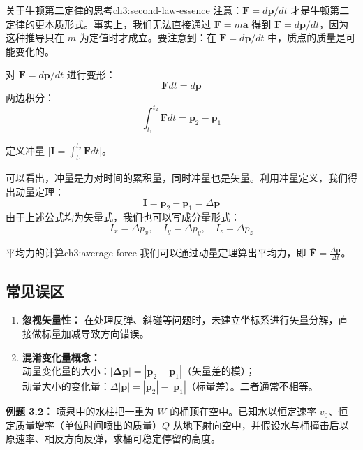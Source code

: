 \begin{knowledge}{关于牛顿第二定律的思考}{ch3:second-law-essence}
	注意：$\boldsymbol{F} = d\boldsymbol{p}/dt$ 才是牛顿第二定律的更本质形式。事实上，我们无法直接通过 $\boldsymbol{F}=m\boldsymbol{a}$ 得到 $\boldsymbol{F}=d\boldsymbol{p}/dt$，因为这种推导只在 $m$ 为定值时才成立。要注意到：在 $\boldsymbol{F}=d\boldsymbol{p}/dt$ 中，质点的质量是可能变化的。
\end{knowledge}

\noindent 对 $\boxed{\boldsymbol{F} = d\boldsymbol{p}/dt}$ 进行变形：
\[ \boldsymbol{F}dt = d\boldsymbol{p} \]
两边积分：
\[ \int_{t_1}^{t_2} \boldsymbol{F} dt = \boldsymbol{p}_2 - \boldsymbol{p}_1 \]

\noindent 定义冲量 [$\boldsymbol{I} = \int_{t_1}^{t_2} \boldsymbol{F} dt$]。

\noindent 可以看出，冲量是力对时间的累积量，同时冲量也是矢量。利用冲量定义，我们得出动量定理：
\[ \boxed{\boldsymbol{I} = \boldsymbol{p}_2 - \boldsymbol{p}_1 = \Delta \boldsymbol{p}} \]
由于上述公式均为矢量式，我们也可以写成分量形式：
\[ I_x = \Delta p_x, \quad I_y = \Delta p_y, \quad I_z = \Delta p_z \]

\begin{knowledge}{平均力的计算}{ch3:average-force}
	我们可以通过动量定理算出平均力，即 $\bar{\boldsymbol{F}} = \frac{\Delta \boldsymbol{p}}{\Delta t}$。
\end{knowledge}

\subsection*{常见误区}
\begin{enumerate}
	\item \textbf{忽视矢量性：} 在处理反弹、斜碰等问题时，未建立坐标系进行矢量分解，直接做标量加减导致方向错误。
	\item \textbf{混淆变化量概念：} \\
	      动量变化量的大小：$|\boldsymbol{\Delta p}| = |\boldsymbol{p}_2 - \boldsymbol{p}_1|$（矢量差的模）；\\
	      动量大小的变化量：$\Delta|\boldsymbol{p}|  = |\boldsymbol{p}_2| - |\boldsymbol{p}_1|$（标量差）。二者通常不相等。
\end{enumerate}

\vspace{1em}
\noindent\textbf{例题 3.2：} 喷泉中的水柱把一重为 $W$ 的桶顶在空中。已知水以恒定速率 $v_0$、恒定质量增率（单位时间喷出的质量）$Q$ 从地下射向空中，并假设水与桶撞击后以原速率、相反方向反弹，求桶可稳定停留的高度。

